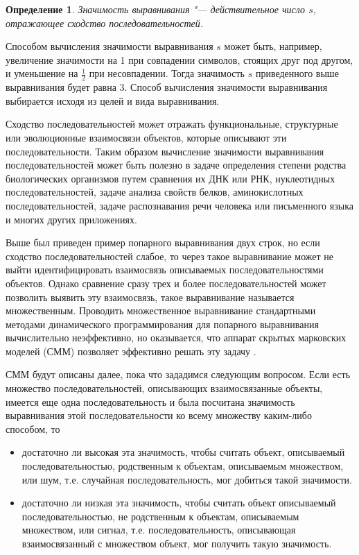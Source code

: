 \documentclass[specialist,
substylefile = spbu_report.rtx,
subf,href,colorlinks=true, 12pt]{disser}
\newtheorem{defenition}{Определение}
\begin{document}
		\begin{defenition}
			Значимость выравнивания "--- действительное число $s$, отражающее сходство последовательностей. 
		\end{defenition}
		Способом вычисления значимости выравнивания $s$ может быть, например, увеличение значимости на 1 при совпадении символов, стоящих друг под другом, и уменьшение на $\frac{1}{2}$ при несовпадении. Тогда значимость $s$ приведенного выше выравнивания будет равна 3. Способ вычисления значимости выравнивания выбирается исходя из целей и вида выравнивания.
		
		Сходство последовательностей может отражать функциональные, структурные или эволюционные взаимосвязи объектов, которые описывают эти последовательности. Таким образом вычисление значимости выравнивания последовательностей может быть полезно в задаче определения степени родства биологических организмов путем сравнения их ДНК или РНК, нуклеотидных последовательностей, задаче анализа свойств белков, аминокислотных последовательностей, задаче распознавания речи человека или письменного языка и многих других приложениях.
		
		Выше был приведен пример попарного выравнивания двух строк, но если сходство последовательностей слабое, то через такое выравнивание может не выйти идентифицировать взаимосвязь описываемых последовательностями объектов. Однако сравнение сразу трех и более последовательностей может позволить выявить эту взаимосвязь, такое выравнивание называется множественным. Проводить множественное выравнивание стандартными методами динамического программирования для попарного выравнивания \cite{Compeau2015} вычислительно неэффективно, но оказывается, что аппарат скрытых марковских моделей (СММ) позволяет эффективно решать эту задачу \cite{Dugad1996, Compeau2015a}. 
		
		СММ будут описаны далее, пока что зададимся следующим вопросом. Если есть множество последовательностей, описывающих взаимосвязанные объекты, имеется еще одна последовательность и была посчитана значимость выравнивания этой последовательности ко всему множеству каким-либо способом, то
		\begin{itemize}
			\item достаточно ли высокая эта значимость, чтобы считать объект, описываемый последовательностью, родственным к объектам, описываемым множеством, или шум, т.е. случайная последовательность, мог добиться такой значимости.
			\item достаточно ли низкая эта значимость, чтобы считать объект описываемый последовательностью, не родственным к объектам, описываемым множеством, или сигнал, т.е. последовательность, описывающая взаимосвязанный с множеством объект, мог получить такую значимость. 
		\end{itemize}
	
\end{document}
